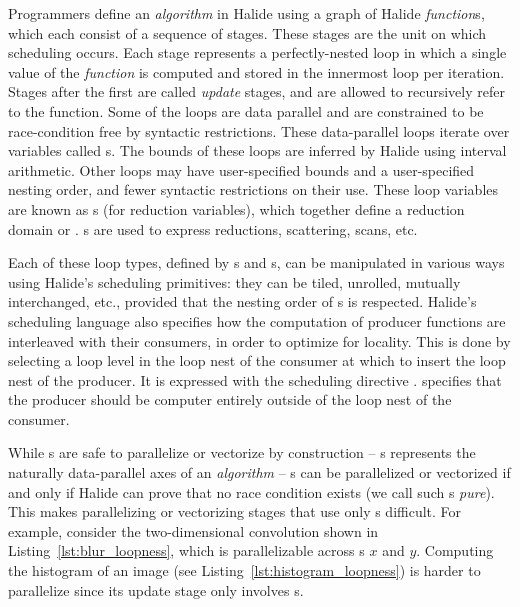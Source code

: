 Programmers define an \emph{algorithm} in Halide using a graph of Halide \emph{function}s, which each consist of a sequence of stages. These stages are the unit on which scheduling occurs. Each stage represents a perfectly-nested loop in which a single value of the \emph{function} is computed and stored in the innermost loop per iteration. Stages after the first are called \emph{update} stages, and are allowed to recursively refer to the function. Some of the loops are data parallel and are constrained to be race-condition free by syntactic restrictions. These data-parallel loops iterate over variables called s. The bounds of these loops are inferred by Halide using interval arithmetic. Other loops may have user-specified bounds and a user-specified nesting order, and fewer syntactic restrictions on their use. These loop variables are known as s (for reduction variables), which together define a reduction domain or . s are used to express reductions, scattering, scans, etc.

Each of these loop types, defined by s and s, can be manipulated in various ways using Halide's scheduling primitives: they can be tiled, unrolled, mutually interchanged, etc., provided that the nesting order of s is respected. Halide's scheduling language also specifies how the computation of producer functions are interleaved with their consumers, in order to optimize for locality. This is done by selecting a loop level in the loop nest of the consumer at which to insert the loop nest of the producer. It is expressed with the scheduling directive .  specifies that the producer should be computer entirely outside of the loop nest of the consumer.

While s are safe to parallelize or vectorize by construction -- s represents the naturally data-parallel axes of an \emph{algorithm} -- s can be parallelized or vectorized if and only if Halide can prove that no race condition exists (we call such s \emph{pure}). This makes parallelizing or vectorizing stages that use only s difficult. For example, consider the two-dimensional convolution shown in Listing~\ref{lst:blur_loopness}, which is parallelizable across s $x$ and $y$. Computing the histogram of an image (see Listing~\ref{lst:histogram_loopness}) is harder to parallelize since its update stage only involves s.

